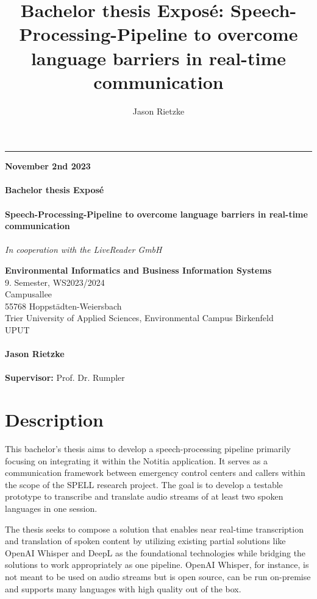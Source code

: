 \documentclass[a4paper,10pt]{article}
\title{Bachelor thesis Exposé: Speech-Processing-Pipeline to overcome language barriers in real-time communication}
\author{Jason Rietzke}
\begin{document}
\begin{titlepage}
\raggedleft
\rule{1pt}{\textheight}
\hspace{0.05\textwidth}
\parbox[b]{0.85\textwidth}{
  {\textbf{November 2nd 2023}}\\\\
  {\Huge\bfseries Bachelor thesis Exposé \\[0.5\baselineskip]}\\[2\baselineskip]
  {\Large\bfseries Speech-Processing-Pipeline to overcome language barriers in real-time communication \\[0.5\baselineskip]}\\[2\baselineskip]
  {\large\textit{In cooperation with the LiveReader GmbH}}\\[4\baselineskip]

  \vspace{0.28\textheight}

  {\textbf{Environmental Informatics and Business Information Systems}\\}
  {9. Semester, WS2023/2024}\\
  {Campusallee}\\
  {55768 Hoppstädten-Weiersbach}\\
  {Trier University of Applied Sciences, Environmental Campus Birkenfeld}\\
  {UPUT}\\
  \\
  {\textbf{Jason Rietzke}\\}
  \\
  {\textbf{Supervisor:} Prof. Dr. Rumpler}\\
}

\end{titlepage}

\restoregeometry
\nopagecolor


\section{Description}
This bachelor's thesis aims to develop a speech-processing pipeline primarily focusing on integrating it within the Notitia application.
It serves as a communication framework between emergency control centers and callers within the scope of the SPELL research project.
The goal is to develop a testable prototype to transcribe and translate audio streams of at least two spoken languages in one session.

The thesis seeks to compose a solution that enables near real-time transcription and translation of spoken content by utilizing existing partial solutions like OpenAI Whisper and DeepL as the foundational technologies while bridging the solutions to work appropriately as one pipeline.
OpenAI Whisper, for instance, is not meant to be used on audio streams but is open source, can be run on-premise and supports many languages with high quality out of the box.
\end{document}
